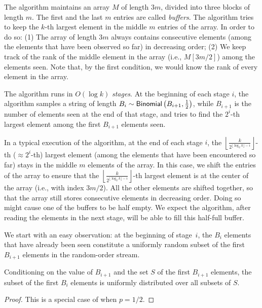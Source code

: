 The algorithm maintains an array $M$ of length $3m$, divided into three blocks of length $m$. The first and the last $m$ entries are called \emph{buffers}. The algorithm tries to keep the $k$-th largest element in the middle $m$ entries of the array. In order to do so: (1) The array of length $3m$ always contains consecutive elements (among the elements that have been observed so far) in decreasing order; (2) We keep track of the rank of the middle element in the array (i.e., $M[3m/2]$) among the elements seen. Note that, by the first condition, we would know the rank of every element in the array.
 
The algorithm runs in $O(\log k)$ \emph{stages}. At the beginning of each stage $i$, the algorithm samples a string of length $B_i \sim \mathsf{Binomial}\left(B_{i+1}, \frac{1}{2}\right)$, while $B_{i+1}$ is the number of elements seen at the end of that stage, and tries to find the $2^i$-th largest element among the first $B_{i+1}$ elements seen.

In a typical execution of the algorithm, at the end of each stage $i$, the $\left\lfloor\frac{k}{2^{\lfloor\log_2 k\rfloor -i}}\right\rfloor$-th ($\approx 2^i$-th) largest element (among the elements that have been encountered so far) stays in the middle $m$ elements of the array. In this case, we shift the entries of the array to ensure that the $\left\lfloor\frac{k}{2^{\lfloor\log_2 k\rfloor -i}}\right\rfloor$-th largest element is at the center of the array (i.e., with index $3m/2$). All the other elements are shifted together, so that the array still stores consecutive elements in decreasing order. Doing so might cause one of the buffers to be half empty. We expect the algorithm, after reading the elements in the next stage, will be able to fill this half-full buffer.
 
We start with an easy observation: at the beginning of stage~$i$, the $B_i$ elements that have already been seen constitute a uniformly random subset of the first $B_{i+1}$ elements in the random-order stream.
\begin{lemma}\label{lemma:uniform-subset}
    Conditioning on the value of $B_{i+1}$ and the set $S$ of the first $B_{i+1}$ elements, the subset of the first $B_i$ elements is uniformly distributed over all subsets of $S$.
\end{lemma}

\begin{proof}
    This is a special case of  when $p = 1/2$.
\end{proof}

